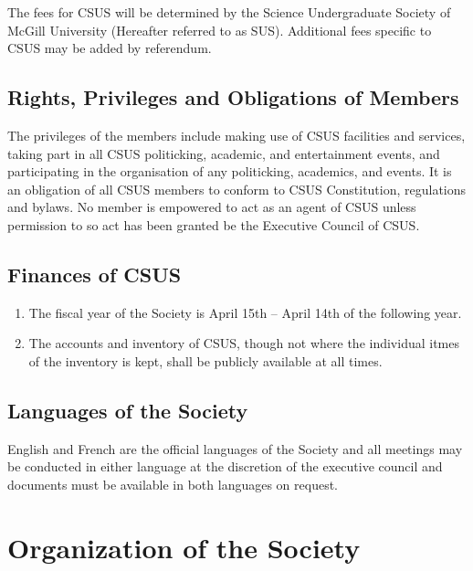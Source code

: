The fees for CSUS will be determined by the Science Undergraduate
Society of McGill University (Hereafter referred to as SUS). Additional
fees specific to CSUS may be added by referendum.

\subsection{Rights, Privileges and Obligations of
Members}\label{rights-privileges-and-obligations-of-members}

The privileges of the members include making use of CSUS facilities and
services, taking part in all CSUS politicking, academic, and
entertainment events, and participating in the organisation of any
politicking, academics, and events. It is an obligation of all CSUS
members to conform to CSUS Constitution, regulations and bylaws. No
member is empowered to act as an agent of CSUS unless permission to so
act has been granted be the Executive Council of CSUS.

\subsection{Finances of CSUS}\label{finances-of-csus}

\begin{enumerate}
\def\labelenumi{\arabic{enumi}.}
\item
  The fiscal year of the Society is April 15th -- April 14th of the
  following year.
\item
  The accounts and inventory of CSUS, though not where the individual
  itmes of the inventory is kept, shall be publicly available at all
  times.
\end{enumerate}

\subsection{Languages of the Society}\label{languages-of-the-society}

English and French are the official languages of the Society and all
meetings may be conducted in either language at the discretion of the
executive council and documents must be available in both languages on
request.

\section{Organization of the Society}\label{organization-of-the-society}

